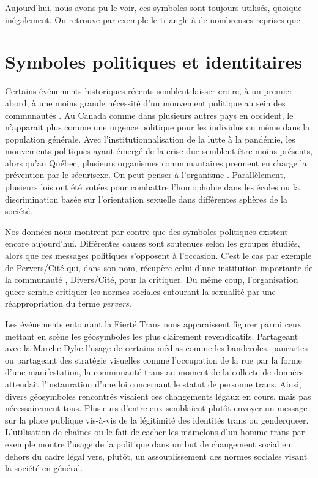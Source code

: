 Aujourd'hui, nous avons pu le voir, ces symboles sont toujours utilisés, quoique inégalement.
On retrouve par exemple le triangle à de nombreuses reprises que

\section{Symboles politiques et identitaires}
\label{sec:symboles_politiques_et_identitaire}
Certains événements historiques récents semblent laisser croire, à un premier abord, à une moins grande nécessité d'un mouvement politique au sein des communautés \lgbt{}.
Au Canada comme dans plusieurs autres pays en occident, le \sida{} n'apparait plus comme une urgence politique pour les individus \lgbt{} ou même dans la population générale.
Avec l'institutionnalisation de la lutte à la pandémie, les mouvements politiques ayant  émergé de la crise due \vih{} semblent être moins présents, alors qu'au Québec, plusieurs organismes communautaires prennent en charge la prévention par le sécurisexe.
On peut penser à l'organisme \miels{}.
Parallèlement, plusieurs lois ont été votées pour combattre l'homophobie dans les écoles ou la discrimination basée sur l'orientation sexuelle dans différentes sphères de la société.

Nos données nous montrent par contre que des symboles politiques existent encore aujourd'hui.
Différentes causes sont soutenues selon les groupes étudiés, alors que ces messages politiques s'opposent à l'occasion.
C'est le cas par exemple de Pervers/Cité qui, dans son nom, récupère celui d'une institution importante de la communauté \lgbt{}, Divers/Cité, pour la critiquer.
Du même coup, l'organisation queer semble critiquer les normes sociales entourant la sexualité par une réappropriation du terme \emph{pervers}.

Les événements entourant la Fierté Trans nous apparaissent figurer parmi ceux mettant en scène les géosymboles les plus clairement revendicatifs.
Partageant avec la Marche Dyke l'usage de certains médias comme les banderoles, pancartes ou partageant des stratégie visuelles comme l'occupation de la rue par la forme d'une manifestation, la communauté trans au moment de la collecte de données attendait l'instauration d'une loi concernant le statut de personne trans.
Ainsi, divers géosymboles rencontrés visaient ces changements légaux en cours, mais pas nécessairement tous.
Plusieurs d'entre eux semblaient plutôt envoyer un message sur la place publique vis-à-vis de la légitimité des identités trans ou genderqueer.
L'utilisation de chaînes ou le fait de cacher les mamelons d'un homme trans par exemple montre l'usage de la politique dans un but de changement social en dehors du cadre légal vers, plutôt, un assouplissement des normes sociales visant la société en général.

